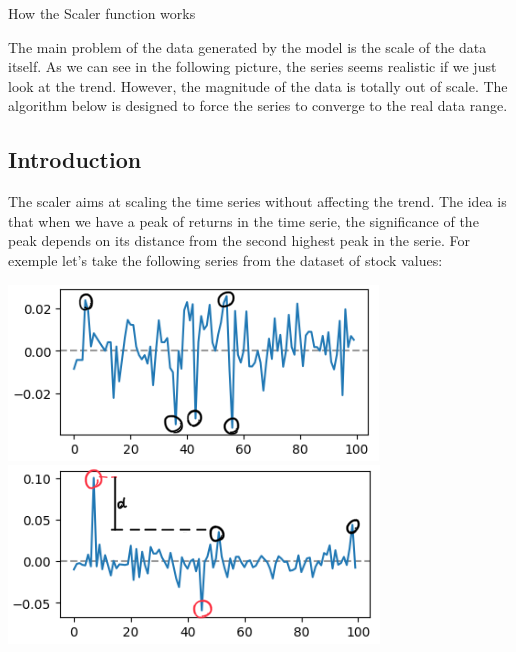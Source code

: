 \documentclass{article}
\begin{document}

\begin{center}
    {\huge{How the Scaler function works}}
\end{center}    
    \begin{multicols}{2}
    The main problem of the data generated by the model is the scale of the data itself.
    As we can see in the following picture, the series seems realistic if we just look at the trend.
    However, the magnitude of the data is totally out of scale. The algorithm below is designed to force
    the series to converge to the real data range.
    \subsection*{Introduction}
    The scaler aims at scaling the time series without affecting the trend. The idea is that when we have 
    a peak of returns in the time serie, the significance of the peak depends on its distance from the second highest peak in the serie. For exemple let's take the following series from the dataset of stock values:\\
    \begin{center}
        \includegraphics[scale = 0.7]{imgs/riccardo/small_peaks.png}
        \includegraphics[scale = 0.7]{imgs/riccardo/big_peaks.png}\\
    \end{center}

\end{multicols}
\end{document}
